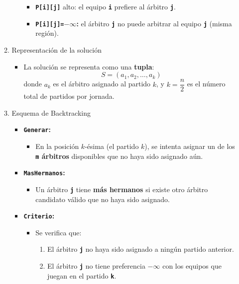 \begin{enumerate}[label=\color{red}\textbf{\arabic*)}]
\begin{enumerate}[label=\arabic*)]
\begin{itemize}[label=\textbullet]
\begin{itemize}[label=\textbullet]
            \item \textbf{\texttt{P[i][j]}} alto: el equipo \textbf{\texttt{i}} prefiere al árbitro \textbf{\texttt{j}}.
            \item \textbf{\texttt{P[i][j]=$-\infty$}:} el árbitro \textbf{\texttt{j}} no puede arbitrar al equipo \textbf{\texttt{j}} (misma región). 
          \end{itemize}
      \end{itemize}
    \item Representación de la solución
      \begin{itemize}[label=\textbullet]
        \item La solución se representa como una \textbf{tupla}:
          \[
          S=(a_1,a_2,\dots,a_{k})
          \] 
          donde $a_k$ es el árbitro asignado al partido  $k$, y  $k=\dfrac{n}{2}$ es el número total de partidos por jornada.
      \end{itemize}
    \item Esquema de Backtracking
      \begin{itemize}[label=\textbullet]
        \item \textbf{\texttt{Generar}:}
          \begin{itemize}[label=\textbullet]
            \item En la posición $k$-ésima (el partido $k$), se intenta asignar un de los \textbf{\texttt{m} árbitros} disponibles que no haya sido asignado aún.
          \end{itemize}
        \item \textbf{\texttt{MasHermanos}:}
          \begin{itemize}[label=\textbullet]
            \item Un árbitro \textbf{\texttt{j}} tiene \textbf{más hermanos} si existe otro árbitro candidato válido que no haya sido asignado.
          \end{itemize}
        \item \textbf{\texttt{Criterio}:}
          \begin{itemize}[label=\textbullet]
            \item Se verifica que:
              \begin{enumerate}[label=\arabic*)]
                \item El árbitro \textbf{\texttt{j}} no haya sido asignado a ningún partido anterior.
                \item El árbitro \textbf{\texttt{j}} no tiene preferencia $-\infty$ con los equipos que juegan en el partido \textbf{\texttt{k}}.

\end{enumerate}
\end{itemize}
\end{itemize}
\end{enumerate}
\end{enumerate}

